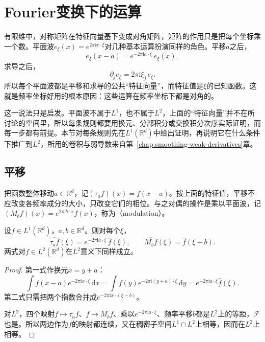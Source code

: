 \section{Fourier变换下的运算}
\label{sec:fourier-operations}

有限维中，对称矩阵在特征向量基下变成对角矩阵，矩阵的作用只是把每个坐标乘一个数。平面波$e_\xi(x)=e^{2\pi\mathrm ix\cdot\xi}$对几种基本运算扮演同样的角色。平移$a$之后，
\[
e_\xi(x-a)=e^{-2\pi\mathrm ia\cdot\xi}\,e_\xi(x),
\]
求导之后，
\[
\partial_je_\xi=2\pi\mathrm i\xi_j\,e_\xi .
\]
所以每个平面波都是平移和求导的公共“特征向量”，而特征值是$\xi$的已知函数。这就是频率坐标好用的根本原因：这些运算在频率坐标下都是对角的。

这一说法只是启发。平面波不属于$L^1$，也不属于$L^2$，上面的“特征向量”并不在所讨论的空间里，所以每条规则都要用换元、分部积分或交换积分次序实际证明，而每一步都有前提。本节对每条规则先在$L^1(\mathbb R^d)$中给出证明，再说明它在什么条件下推广到$L^2$，所用的卷积与弱导数来自第~\ref{chap:smoothing-weak-derivatives}章。

\subsection{平移}
\label{sec:fourier-translation}

把函数整体移动$a\in\mathbb R^d$，记$(\tau_af)(x)=f(x-a)$。按上面的特征值，平移不应改变各频率成分的大小，只改变它们的相位。与之对偶的操作是乘以平面波，记$(M_bf)(x)=e^{2\pi\mathrm ib\cdot x}f(x)$，称为（modulation）。

\begin{theorem}[平移与调制]
\label{thm:fourier-translation}
设$f\in L^1(\mathbb R^d)$，$a,b\in\mathbb R^d$。则对每个$\xi$，
\begin{equation}
\widehat{\tau_af}(\xi)=e^{-2\pi\mathrm ia\cdot\xi}\,\widehat f(\xi),\qquad\widehat{M_bf}(\xi)=\widehat f(\xi-b).
\label{eq:fourier-translation}
\end{equation}
两式对$f\in L^2(\mathbb R^d)$在$L^2$意义下同样成立。
\end{theorem}

\begin{proof}
第一式作换元$x=y+a$：
\[
\int f(x-a)e^{-2\pi\mathrm ix\cdot\xi}\,\mathrm dx=\int f(y)e^{-2\pi\mathrm i(y+a)\cdot\xi}\,\mathrm dy=e^{-2\pi\mathrm ia\cdot\xi}\widehat f(\xi).
\]
第二式只需把两个指数合并成$e^{-2\pi\mathrm ix\cdot(\xi-b)}$。

对$L^2$，四个映射$f\mapsto\tau_af$、$f\mapsto M_bf$、乘以$e^{-2\pi\mathrm ia\cdot\xi}$、频率平移$b$都是$L^2$上的等距，$\mathcal F$也是。所以两边作为$f$的映射都连续，又在稠密子空间$L^1\cap L^2$上相等，因而在$L^2$上相等。
\end{proof}


